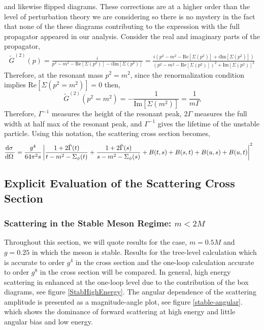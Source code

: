 \documentclass[12pt]{extarticle}
\begin{document}
and likewise flipped diagrams.
These corrections are at a higher order than the level of perturbation theory we are considering so there is no mystery in the fact that none of the these diagrams contributing to the expression with the full propagator appeared in our analysis.
Consider the real and imaginary parts of the propagator,
\begin{align*}
\tilde{G}^{(2)}(p) = \frac{i}{p^2 - m^2 - \mathrm{Re}[\Sigma(p^2)] - i \mathrm{Im}[\Sigma(p^2)]} = \frac{i(p^2 - m^2 - \mathrm{Re}[\Sigma(p^2)] + i \mathrm{Im}[\Sigma(p^2)])}{(p^2 - m^2 - \mathrm{Re}[\Sigma(p^2)])^2 + \mathrm{Im}[\Sigma(p^2)]^2}
\end{align*}
Therefore, at the resonant mass $p^2 = m^2$, since the renormalization condition implies $\mathrm{Re}[\Sigma(p^2 = m^2)] = 0$ then,
\[ \tilde{G}^{(2)}(p^2 = m^2) = - \frac{1}{\mathrm{Im}[\Sigma(m^2)]} = \frac{1}{m \Gamma} \]
Therefore, $\Gamma^{-1}$ measures the height of the resonant peak, $2 \Gamma$ measures the full width at half max of the resonant peak, and $\Gamma^{-1}$ gives the lifetime of the unstable particle.
Using this notation, the scattering cross section becomes, 
\begin{align*}
\frac{\mathrm{d}\sigma \:}{\mathrm{d}\Omega \:} 
&= \frac{g^4}{64 \pi^2 s} \left| \frac{1 + 2\tilde{\Gamma}(t)}{t - m^2 - \Sigma_\phi(t)} + \frac{1 + 2\tilde{\Gamma}(s)}{s - m^2 - \Sigma_\phi(s)} + B(t, s) + B(s, t) + B(u, s) + B(u, t)  \right|^2 
\end{align*}

\subsection{Explicit Evaluation of the Scattering Cross Section}

\subsubsection{Scattering in the Stable Meson Regime: $m < 2 M$}
Throughout this section, we will quote results for the case, $m = 0.5M$ and $g = 0.25$ in which the meson is stable. Results for the tree-level calculation which is accurate to order $g^4$ in the cross section and the one-loop calculation accurate to order $g^8$ in the cross section will be compared. In general, high energy scattering in enhanced at the one-loop level due to the contribution of the box diagrams, see figure \ref{StabHighEnergy}. The angular dependence of the scattering amplitude is presented as a magnitude-angle plot, see figure \ref{stable-angular}. which shows the dominance of forward scattering at high energy and little angular bias and low energy.
\end{document}
